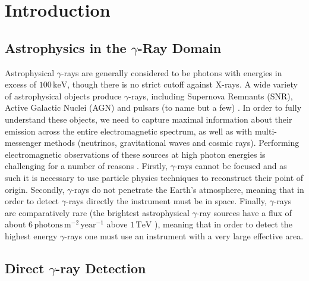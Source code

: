 \chapter{\label{ch:1-intro}Introduction} 
\minitoc
\section{Astrophysics in the \ensuremath{\gamma}-Ray Domain}
Astrophysical $\gamma$-rays are generally considered to be photons with energies in excess of $\mathrm{100\,keV}$, though there is no strict cutoff against X-rays. A wide variety of astrophysical objects produce $\gamma$-rays, including Supernova Remnants (SNR), Active Galactic Nuclei (AGN) and pulsars (to name but a few) \cite{scienceCTA}. In order to fully understand these objects, we need to capture maximal information about their emission across the entire electromagnetic spectrum, as well as with multi-messenger methods (neutrinos, gravitational waves and cosmic rays).  Performing electromagnetic observations of these sources at high photon energies is challenging for a number of reasons \cite{jamieiact}. Firstly,  $\gamma$-rays cannot be focused and as such it is necessary to use particle physics techniques to reconstruct their point of origin. Secondly, $\gamma$-rays do not penetrate the Earth's atmosphere, meaning that in order to detect $\gamma$-rays directly the instrument must be in space. Finally, $\gamma$-rays are comparatively rare (the brightest astrophysical $\gamma$-ray sources have a flux of about $\mathrm{6\,photons\,m^{-2}\,year^{-1}}$ above $\mathrm{1\,TeV}$ \cite{jamieiact}), meaning that in order to detect the highest energy $\gamma$-rays one must use an instrument with a very large effective area.
\section{Direct \ensuremath{\gamma}-ray Detection}
